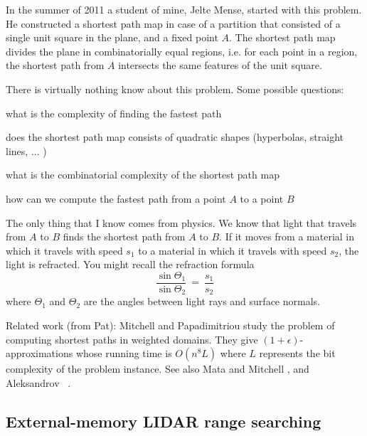 \documentclass{patmorin}
\newcommand{\poser}[1]{\noindent{\textit{#1}}}
\begin{document}
In the summer of 2011 a student of mine, Jelte Mense, started with this
problem. He constructed a shortest path map in case of a partition that
consisted of a single unit square in the plane, and a fixed point $A$.
The shortest path map divides the plane in combinatorially equal regions,
i.e. for each point in a region, the shortest path from $A$ intersects
the same features of the unit square.

There is virtually nothing know about this problem. Some possible 
questions:  

\begin{op}
  what is the complexity of finding the fastest path
\end{op}

\begin{op}
  does the shortest path map consists of quadratic shapes (hyperbolas,
  straight lines, $\ldots$ )
\end{op}

\begin{op}
  what is the combinatorial complexity of the shortest path map
\end{op}

\begin{op}
  how can we compute the fastest path from a point $A$ to a point $B$
\end{op}


The only thing that I know comes from physics. We know that light that
travels from $A$ to $B$ finds the shortest path from $A$ to $B$. If it
moves from a material in which it travels with speed $s_1$ to a material
in which it travels with speed $s_2$, the light is refracted. You might
recall the refraction formula
\[ 
   \frac{\sin \Theta_1}{\sin \Theta_2} ~=~ \frac{s_1}{s_2}
\]
where $\Theta_1$ and $\Theta_2$ are the angles between light rays and
surface normals.

Related work (from Pat):  Mitchell and Papadimitriou \cite{mp91} study the
problem of computing shortest paths in weighted domains.  They give
$(1+\epsilon)$-approximations whose running time is $O(n^8L)$ where $L$
represents the bit complexity of the problem instance.  See also Mata
and Mitchell \cite{mm97}, and Aleksandrov \etal\ \cite{ams05}.

\subsection{External-memory LIDAR range searching}

\poser{Rolf Fagerberg}
\end{document}
